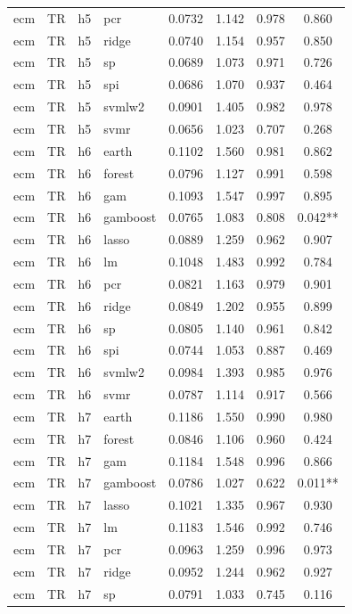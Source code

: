 \begin{ThreePartTable}
\begin{longtable}[t]{llclcccc}
ecm & TR & h5 & pcr & 0.0732 & 1.142 & 0.978 & 0.860\\
ecm & TR & h5 & ridge & 0.0740 & 1.154 & 0.957 & 0.850\\
ecm & TR & h5 & sp & 0.0689 & 1.073 & 0.971 & 0.726\\
ecm & TR & h5 & spi & 0.0686 & 1.070 & 0.937 & 0.464\\
ecm & TR & h5 & svmlw2 & 0.0901 & 1.405 & 0.982 & 0.978\\
ecm & TR & h5 & svmr & 0.0656 & 1.023 & 0.707 & 0.268\\
\addlinespace
ecm & TR & h6 & earth & 0.1102 & 1.560 & 0.981 & 0.862\\
ecm & TR & h6 & forest & 0.0796 & 1.127 & 0.991 & 0.598\\
ecm & TR & h6 & gam & 0.1093 & 1.547 & 0.997 & 0.895\\
ecm & TR & h6 & gamboost & 0.0765 & 1.083 & 0.808 & 0.042**\\
ecm & TR & h6 & lasso & 0.0889 & 1.259 & 0.962 & 0.907\\
ecm & TR & h6 & lm & 0.1048 & 1.483 & 0.992 & 0.784\\
ecm & TR & h6 & pcr & 0.0821 & 1.163 & 0.979 & 0.901\\
ecm & TR & h6 & ridge & 0.0849 & 1.202 & 0.955 & 0.899\\
ecm & TR & h6 & sp & 0.0805 & 1.140 & 0.961 & 0.842\\
ecm & TR & h6 & spi & 0.0744 & 1.053 & 0.887 & 0.469\\
ecm & TR & h6 & svmlw2 & 0.0984 & 1.393 & 0.985 & 0.976\\
ecm & TR & h6 & svmr & 0.0787 & 1.114 & 0.917 & 0.566\\
\addlinespace
ecm & TR & h7 & earth & 0.1186 & 1.550 & 0.990 & 0.980\\
ecm & TR & h7 & forest & 0.0846 & 1.106 & 0.960 & 0.424\\
ecm & TR & h7 & gam & 0.1184 & 1.548 & 0.996 & 0.866\\
ecm & TR & h7 & gamboost & 0.0786 & 1.027 & 0.622 & 0.011**\\
ecm & TR & h7 & lasso & 0.1021 & 1.335 & 0.967 & 0.930\\
ecm & TR & h7 & lm & 0.1183 & 1.546 & 0.992 & 0.746\\
ecm & TR & h7 & pcr & 0.0963 & 1.259 & 0.996 & 0.973\\
ecm & TR & h7 & ridge & 0.0952 & 1.244 & 0.962 & 0.927\\
ecm & TR & h7 & sp & 0.0791 & 1.033 & 0.745 & 0.116\\

\end{longtable}
\end{ThreePartTable}
